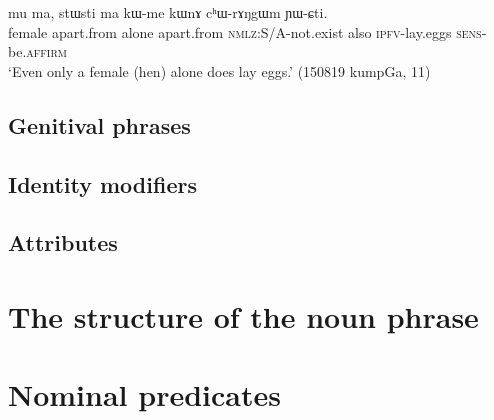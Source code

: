   \begin{exe}
\ex \label{ex:ma.kWme.kWnA}
\gll  mu ma, stɯsti ma kɯ-me kɯnɤ cʰɯ-rɤŋgɯm ɲɯ-ɕti. \\
female apart.from alone apart.from \textsc{nmlz}:S/A-not.exist also \textsc{ipfv}-lay.eggs \textsc{sens}-be.\textsc{affirm} \\
\glt `Even only a female (hen) alone does lay eggs.' (150819 kumpGa, 11)
\end{exe}
  
\subsection{Genitival phrases}
%
%
\subsection{Identity modifiers} \label{sec:identity.modifier}


\subsection{Attributes}

\section{The structure of the noun phrase}

\section{Nominal predicates}
